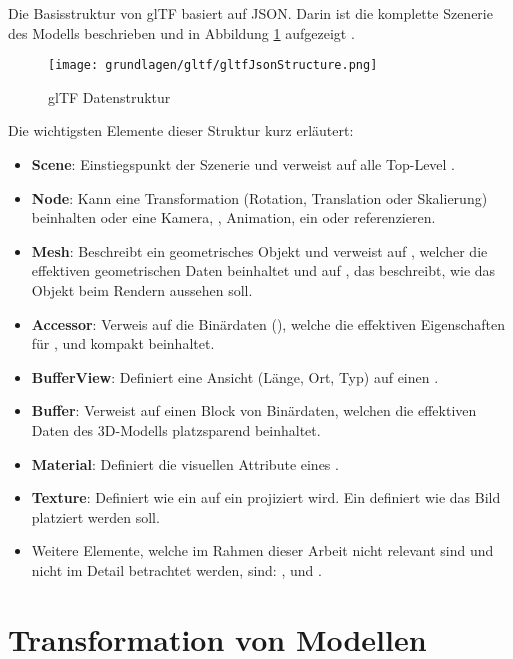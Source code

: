 Die Basisstruktur von glTF basiert auf JSON. Darin ist die komplette Szenerie des Modells beschrieben und in Abbildung \ref{fig:gltfDatastructure} aufgezeigt \cite{gltfTutorialStructure}.
\begin{figure}[H]
  \centering
  \texttt{[image: grundlagen/gltf/gltfJsonStructure.png]}
  \caption{glTF Datenstruktur \cite{gltfTutorialStructure}}
  \label{fig:gltfDatastructure}
\end{figure}

Die wichtigsten Elemente dieser Struktur kurz erläutert:
\begin{itemize}
  \item \textbf{Scene}: Einstiegspunkt der Szenerie und verweist auf alle Top-Level .
  \item \textbf{Node}: Kann eine Transformation (Rotation, Translation oder Skalierung) beinhalten oder eine Kamera, , Animation, ein  oder  referenzieren.
  \item  \textbf{Mesh}: Beschreibt ein geometrisches Objekt und verweist auf , welcher die effektiven geometrischen Daten beinhaltet und auf , das beschreibt, wie das Objekt beim Rendern aussehen soll.
  \item \textbf{Accessor}: Verweis auf die Binärdaten (), welche die effektiven Eigenschaften für ,  und  kompakt beinhaltet.
  \item \textbf{BufferView}: Definiert eine Ansicht (Länge, Ort, Typ) auf einen .
  \item \textbf{Buffer}: Verweist auf einen Block von Binärdaten, welchen die effektiven Daten des 3D-Modells platzsparend beinhaltet.
  \item \textbf{Material}: Definiert die visuellen Attribute eines .
  \item \textbf{Texture}: Definiert wie ein  auf ein  projiziert wird. Ein  definiert wie das Bild platziert werden soll.
  \item Weitere Elemente, welche im Rahmen dieser Arbeit nicht relevant sind und nicht im Detail betrachtet werden, sind: ,  und .
\end{itemize}

\section{Transformation von Modellen}

